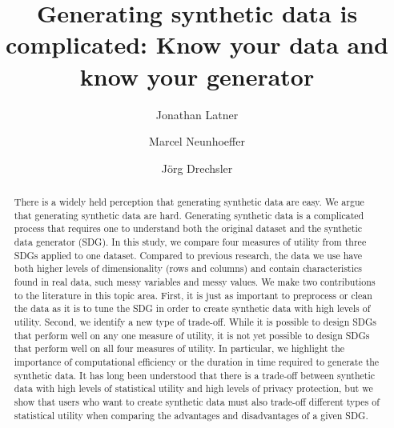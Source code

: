 \documentclass[runningheads]{llncs}
\title{Generating synthetic data is complicated: Know your data and know your generator}
\author{Jonathan Latner\inst{1 (\text{\Letter})\orcidlink{0000-0002-1825-0097}} \and
Marcel Neunhoeffer\inst{1 \orcidlink{0000-0002-9137-5785}}  \and
Jörg Drechsler\inst{1 \orcidlink{0009-0009-5790-3394}}}
\institute{Institute for Employment Research, Nuremberg, Germany
\email{\{jonathan.latner, marcel.neunhoeffer,joerg.drechsler\}@iab.de}}
\begin{document}
\maketitle %

\begin{abstract} %

There is a widely held perception that generating synthetic data are easy.  We argue that generating synthetic data are hard.  Generating synthetic data is a complicated process that requires one to understand both the original dataset and the synthetic data generator (SDG).  In this study, we compare four measures of utility from three SDGs applied to one dataset.  Compared to previous research, the data we use have both higher levels of dimensionality (rows and columns) and contain characteristics found in real data, such messy variables and messy values.  We make two contributions to the literature in this topic area.  First, it is just as important to preprocess or clean the data as it is to tune the SDG in order to create synthetic data with high levels of utility.  Second, we identify a new type of trade-off.  While it is possible to design SDGs that perform well on any one measure of utility, it is not yet possible to design SDGs that perform well on all four measures of utility.  In particular, we highlight the importance of computational efficiency or the duration in time required to generate the synthetic data.  It has long been understood that there is a trade-off between synthetic data with high levels of statistical utility and high levels of privacy protection, but we show that users who want to create synthetic data must also trade-off different types of statistical utility when comparing the advantages and disadvantages of a given SDG.  

\end{abstract}




\end{document}
